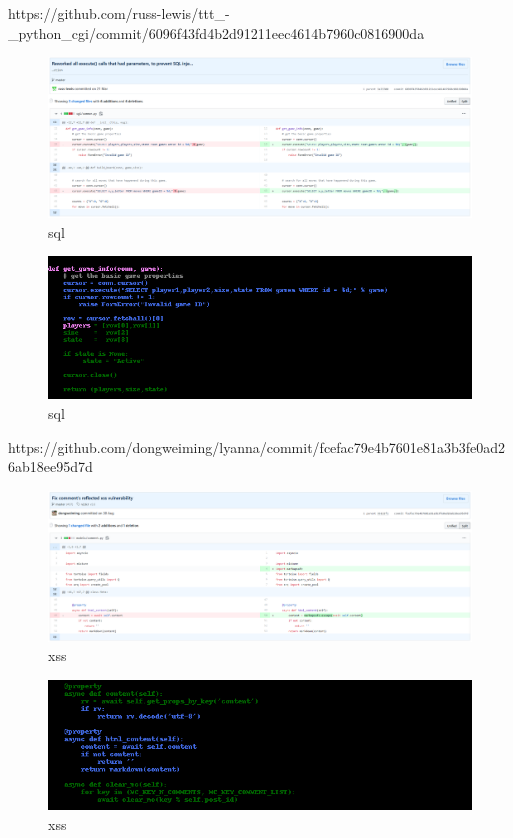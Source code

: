 \documentclass[
a4paper,
pagesize,
pdftex,
12pt,
twoside, %
BCOR=5mm, %
ngerman,
fleqn,
final,
]{scrartcl}
\begin{document}
https://github.com/russ-lewis/ttt\_-\_python\_cgi/commit/6096f43fd4b2d91211eec4614b7960c0816900da



\begin{figure}[h]
	\centering
	\includegraphics[width=\linewidth]{Images/sql5}
	\caption{sql}
	\label{fig:sql5}
\end{figure}
\begin{figure}[h]
	\centering
	\includegraphics[width=\linewidth]{Images/sql5r}
	\caption{sql}
	\label{fig:sql5r}
\end{figure}





https://github.com/dongweiming/lyanna/commit/fcefac79e4b7601e81a3b3fe0ad26ab18ee95d7d



\begin{figure}[h]
	\centering
	\includegraphics[width=\linewidth]{Images/xss1}
	\caption{xss}
	\label{fig:xss1}
\end{figure}
\begin{figure}[h]
	\centering
	\includegraphics[width=\linewidth]{Images/xss1r}
	\caption{xss}
	\label{fig:xss1r}
\end{figure}
\end{document}
